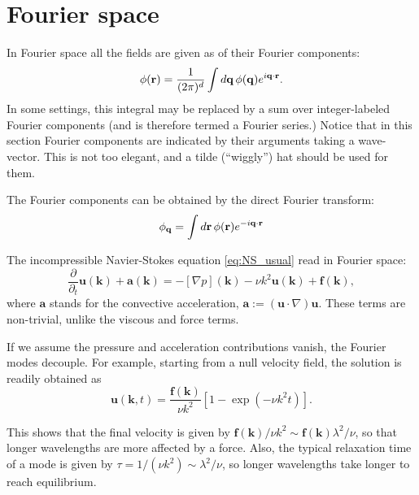 \section{Fourier space}

In Fourier space all the fields are given as  of their Fourier components:
\begin{equation}
	\label{eq:F_q_to_r}
	\phi(\mathbf{r}) = \frac 1{(2\pi)^d}  \int d\mathbf{q} \, \phi(\mathbf{q}) e^{ i\mathbf{q}\cdot\mathbf{r}} .
\end{equation}
In some settings, this integral may be replaced by a sum over integer-labeled Fourier components
(and is therefore termed a Fourier series.)
Notice that in this section Fourier components are indicated by their arguments taking a wave-vector. This is not too elegant, and a tilde (``wiggly'')
hat should be used for them.

The Fourier components can be obtained by the direct Fourier transform:
\begin{equation}
	\label{eq:F_r_to_q}
	\phi_{\mathbf{q}} =                    \int d\mathbf{r} \, \phi(\mathbf{r}) e^{-i\mathbf{q}\cdot\mathbf{r}}  
\end{equation}

The incompressible Navier-Stokes equation \eqref{eq:NS_usual} read in Fourier space:
\begin{equation*}
	\frac{\partial}{\partial_t} \mathbf{u} (\mathbf{k}) + \mathbf{a}(\mathbf{k}) =
	-[\nabla p ](\mathbf{k}) - \nu k^2 \mathbf{u}(\mathbf{k}) + \mathbf{f}(\mathbf{k}) ,
\end{equation*}
where $\mathbf{a}$ stands for the convective acceleration, $ \mathbf{a} := (\mathbf{u}\cdot\nabla)\mathbf{u} $. These terms are non-trivial, unlike the viscous and force terms.

If we assume the pressure and acceleration contributions vanish, the Fourier modes decouple. For example, starting from a null velocity field, the solution is readily obtained as
\begin{equation} \label{eq:Fourier_simple_solution}
	\mathbf{u} (\mathbf{k}, t ) =
	\frac{\mathbf{f}(\mathbf{k})}{\nu k^2}
	\left[ 1-  \exp \left( - \nu k^2 t  \right)   \right]  .
\end{equation}

This shows that the final velocity is given by $\mathbf{f}(\mathbf{k}) / \nu k^2 \sim  \mathbf{f}(\mathbf{k}) \lambda^2 / \nu $, so that longer wavelengths are more affected by a force.
Also, the typical relaxation time of a mode is given by $\tau= 1/( \nu k^2 ) \sim \lambda^2 / \nu$, so longer wavelengths take longer to reach equilibrium.

